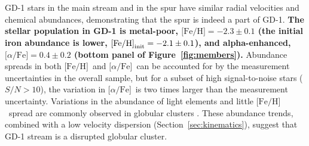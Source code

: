 \documentclass[twocolumn]{aastex63}
\newcommand{\feh}{\ensuremath{\textrm{[Fe/H]}}}
\newcommand{\afe}{\ensuremath{\textrm{[$\alpha$/Fe]}}}
\newcommand{\changes}[1]{{\textbf{#1}}}
\begin{document}
GD-1 stars in the main stream and in the spur have similar radial velocities and chemical abundances, demonstrating that the spur is indeed a part of GD-1.
\changes{
The stellar population in GD-1 is metal-poor, $\feh=-2.3\pm0.1$ (the initial iron abundance is lower, $\feh_{\rm init}=-2.1\pm0.1$), and alpha-enhanced, $\afe=0.4\pm0.2$ (bottom panel of Figure~\ref{fig:members}).
% 
}
Abundance spreads in both \feh\ and \afe\ can be accounted for by the measurement uncertainties in the overall sample, but for a subset of high signal-to-noise stars ($S/N>10$), the variation in \afe\ is two times larger than the measurement uncertainty.
Variations in the abundance of light elements and little \feh\ spread are commonly observed in globular clusters \citep{gratton2019}.
These abundance trends, combined with a low velocity dispersion (Section~\ref{sec:kinematics}), suggest that GD-1 stream is a disrupted globular cluster.
\end{document}
